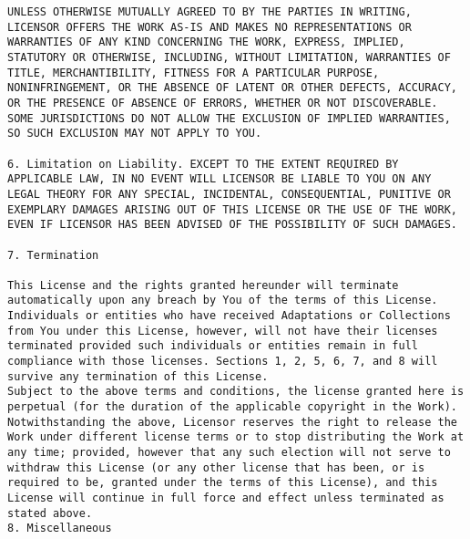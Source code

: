 \documentclass[10pt,A4]{book}
\begin{document}
\begin{verbatim}
UNLESS OTHERWISE MUTUALLY AGREED TO BY THE PARTIES IN WRITING, LICENSOR OFFERS THE WORK AS-IS AND MAKES NO REPRESENTATIONS OR WARRANTIES OF ANY KIND CONCERNING THE WORK, EXPRESS, IMPLIED, STATUTORY OR OTHERWISE, INCLUDING, WITHOUT LIMITATION, WARRANTIES OF TITLE, MERCHANTIBILITY, FITNESS FOR A PARTICULAR PURPOSE, NONINFRINGEMENT, OR THE ABSENCE OF LATENT OR OTHER DEFECTS, ACCURACY, OR THE PRESENCE OF ABSENCE OF ERRORS, WHETHER OR NOT DISCOVERABLE. SOME JURISDICTIONS DO NOT ALLOW THE EXCLUSION OF IMPLIED WARRANTIES, SO SUCH EXCLUSION MAY NOT APPLY TO YOU.

6. Limitation on Liability. EXCEPT TO THE EXTENT REQUIRED BY APPLICABLE LAW, IN NO EVENT WILL LICENSOR BE LIABLE TO YOU ON ANY LEGAL THEORY FOR ANY SPECIAL, INCIDENTAL, CONSEQUENTIAL, PUNITIVE OR EXEMPLARY DAMAGES ARISING OUT OF THIS LICENSE OR THE USE OF THE WORK, EVEN IF LICENSOR HAS BEEN ADVISED OF THE POSSIBILITY OF SUCH DAMAGES.

7. Termination

This License and the rights granted hereunder will terminate automatically upon any breach by You of the terms of this License. Individuals or entities who have received Adaptations or Collections from You under this License, however, will not have their licenses terminated provided such individuals or entities remain in full compliance with those licenses. Sections 1, 2, 5, 6, 7, and 8 will survive any termination of this License.
Subject to the above terms and conditions, the license granted here is perpetual (for the duration of the applicable copyright in the Work). Notwithstanding the above, Licensor reserves the right to release the Work under different license terms or to stop distributing the Work at any time; provided, however that any such election will not serve to withdraw this License (or any other license that has been, or is required to be, granted under the terms of this License), and this License will continue in full force and effect unless terminated as stated above.
8. Miscellaneous


\end{verbatim}
\end{document}
